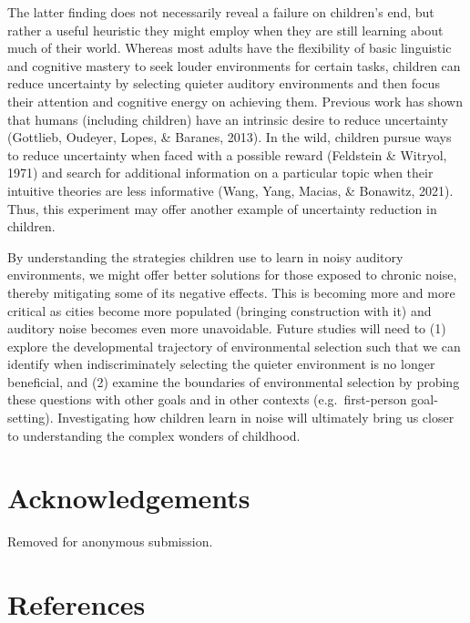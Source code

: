 \documentclass[10pt, letterpaper]{article}
\begin{document}
The latter finding does not necessarily reveal a failure on children's
end, but rather a useful heuristic they might employ when they are still
learning about much of their world. Whereas most adults have the
flexibility of basic linguistic and cognitive mastery to seek louder
environments for certain tasks, children can reduce uncertainty by
selecting quieter auditory environments and then focus their attention
and cognitive energy on achieving them. Previous work has shown that
humans (including children) have an intrinsic desire to reduce
uncertainty (Gottlieb, Oudeyer, Lopes, \& Baranes, 2013). In the wild,
children pursue ways to reduce uncertainty when faced with a possible
reward (Feldstein \& Witryol, 1971) and search for additional
information on a particular topic when their intuitive theories are less
informative (Wang, Yang, Macias, \& Bonawitz, 2021). Thus, this
experiment may offer another example of uncertainty reduction in
children.

By understanding the strategies children use to learn in noisy auditory
environments, we might offer better solutions for those exposed to
chronic noise, thereby mitigating some of its negative effects. This is
becoming more and more critical as cities become more populated
(bringing construction with it) and auditory noise becomes even more
unavoidable. Future studies will need to (1) explore the developmental
trajectory of environmental selection such that we can identify when
indiscriminately selecting the quieter environment is no longer
beneficial, and (2) examine the boundaries of environmental selection by
probing these questions with other goals and in other contexts
(e.g.~first-person goal-setting). Investigating how children learn in
noise will ultimately bring us closer to understanding the complex
wonders of childhood.

\hypertarget{acknowledgements}{%
\section{Acknowledgements}\label{acknowledgements}}

Removed for anonymous submission.

\hypertarget{references}{%
\section{References}\label{references}}

\setlength{\parindent}{-0.1in} 
\setlength{\leftskip}{0.125in}
\end{document}
